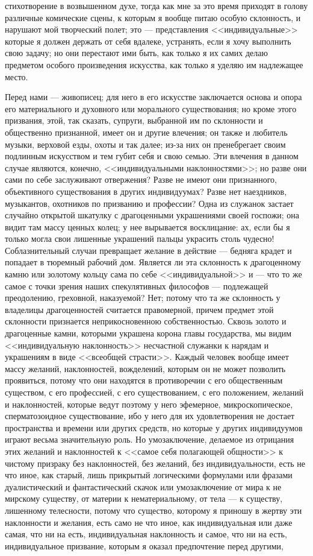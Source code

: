 \documentclass[12pt]{article}
\begin{document}
стихотворение в возвышенном духе, тогда как мне за это время приходят в голову различные комические сцены, к которым я вообще питаю особую склонность, и нарушают мой творческий полет; это --- представления <<индивидуальные>>  которые я должен держать от себя вдалеке, устранять, если я хочу выполнить свою задачу; но они перестают ими быть, как только я их самих делаю предметом особого произведения искусства, как только я уделяю им надлежащее место. 

Перед нами --- живописец; для него в его искусстве заключается основа и опора его материального и духовного или морального существования; но кроме этого призвания, этой, так сказать, супруги, выбранной им по склонности и общественно признанной, имеет он и другие влечения; он также и любитель музыки, верховой езды, охоты и так далее; из-за них он пренебрегает своим подлинным искусством и тем губит себя и свою семью. Эти влечения в данном случае являются, конечно, <<индивидуальными наклонностями>>; но разве они сами по себе заслуживают отвержения? Разве не имеют они признанного, объективного существования в других индивидуумах? Разве нет наездников, музыкантов, охотников по призванию и профессии? Одна из служанок застает случайно открытой шкатулку с драгоценными украшениями своей госпожи; она видит там массу ценных колец; у нее вырывается восклицание: ах, если бы я только могла свои лишенные украшений пальцы украсить столь чудесно! Соблазнительный случаи превращает желание в действие --- бедняга крадет и попадает в тюремный рабочий дом. Является ли эта склонность к драгоценному камню или золотому кольцу сама по себе <<индивидуальной>> и --- что то же самое с точки зрения наших спекулятивных философов --- подлежащей преодолению, греховной, наказуемой? Нет; потому что та же склонность у владелицы драгоценностей считается правомерной, причем предмет этой склонности признается неприкосновенною собственностью. Сквозь золото и драгоценные камни, которыми украшена корона главы государства, мы видим <<индивидуальную наклонность>> несчастной служанки к нарядам и украшениям в виде <<всеобщей страсти>>. Каждый человек вообще имеет массу желаний, наклонностей, вожделений, которым он не может позволить проявиться, потому что они находятся в противоречии с его общественным существом, с его профессией, с его существованием, с его положением, желаний и наклонностей, которые ведут поэтому у него эфемерное, микроскопическое, сперматозоидное существование, ибо у него для их удовлетворения не достает пространства и времени или других средств, но которые у других индивидуумов играют весьма значительную роль. Но умозаключение, делаемое из отрицания этих желаний и наклонностей к <<самое себя полагающей общности>>  к чистому призраку без наклонностей, без желаний, без индивидуальности, есть не что иное, как старый, лишь прикрытый логическими формулами или фразами дуалистический и фантастический скачок или умозаключение от мира к не мирскому существу, от материи к нематериальному, от тела --- к существу, лишенному телесности, потому что существо, которому я приношу в жертву эти наклонности и желания, есть само не что иное, как индивидуальная или даже самая, что ни на есть, индивидуальная наклонность и самое, что ни на есть, индивидуальное призвание, которым я оказал предпочтение перед другими, 
\end{document}
